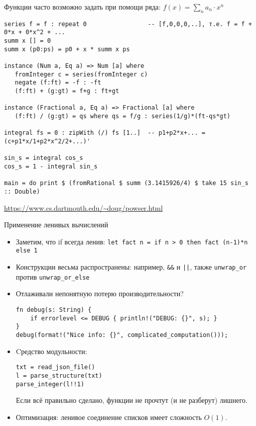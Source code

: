 \documentclass[aspectratio=169]{beamer}
\begin{document}
\begin{frame}[fragile]{Функции часто возможно задать при помощи ряда: $f(x) = \sum_n a_n \cdot x^n$}
\footnotesize
\begin{verbatim}
series f = f : repeat 0                 -- [f,0,0,0,..], т.е. f = f + 0*x + 0*x^2 + ...
summ x [] = 0
summ x (p0:ps) = p0 + x * summ x ps

instance (Num a, Eq a) => Num [a] where
   fromInteger c = series(fromInteger c)
   negate (f:ft) = -f : -ft
   (f:ft) + (g:gt) = f+g : ft+gt

instance (Fractional a, Eq a) => Fractional [a] where
   (f:ft) / (g:gt) = qs where qs = f/g : series(1/g)*(ft-qs*gt)

integral fs = 0 : zipWith (/) fs [1..]  -- p1+p2*x+... = (c+p1*x/1+p2*x^2/2+...)'

sin_s = integral cos_s
cos_s = 1 - integral sin_s

main = do print $ (fromRational $ summ (3.1415926/4) $ take 15 sin_s :: Double)
\end{verbatim}
\url{https://www.cs.dartmouth.edu/~doug/powser.html}
\end{frame}

\begin{frame}[fragile]{Применение ленивых вычислений}
\begin{itemize}
\item Заметим, что if всегда ленив: \verb!let fact n = if n > 0 then fact (n-1)*n else 1!
\item Конструкции весьма распространены: например, \verb!&&! и \verb!||!, также \verb!unwrap_or! против \verb!unwrap_or_else!
\item Отлаживали непонятную потерю производительности?
\begin{verbatim}
fn debug(s: String) {
    if errorlevel <= DEBUG { println!("DEBUG: {}", s); }
}
debug(format!("Nice info: {}", complicated_computation()));
\end{verbatim}
\item Cредство модульности:
\begin{verbatim}
txt = read_json_file()
l = parse_structure(txt)
parse_integer(l!!1)
\end{verbatim}

Если всё правильно сделано, функции не прочтут (и не разберут) лишнего.
\item Оптимизация: ленивое соединение списков имеет сложность $O(1)$.
\end{itemize}
\end{frame}
\end{document}
